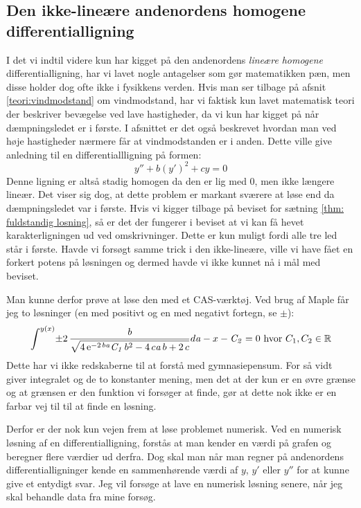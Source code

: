 \subsection{Den ikke-lineære andenordens homogene differentialligning}
\label{teori: Den ikke-linear andenordens ligning}
I det vi indtil videre kun har kigget på den andenordens \textit{lineære} \textit{homogene} differentialligning, har vi lavet nogle antagelser som gør matematikken pæn, men disse holder dog ofte ikke i fysikkens verden.
Hvis man ser tilbage på afsnit \ref{teori:vindmodstand} om vindmodstand, har vi faktisk kun lavet matematisk teori der beskriver bevægelse ved lave hastigheder, da vi kun har kigget på når dæmpningsledet er i første. 
I afsnittet er det også beskrevet hvordan man ved høje hastigheder nærmere får at vindmodstanden er i anden.
Dette ville give anledning til en differentiallligning på formen:
$$y'' + b(y')^2 + cy = 0$$
Denne ligning er altså stadig homogen da den er lig med $0$, men ikke længere lineær. 
Det viser sig dog, at dette problem er markant sværere at løse end da dæmpningsledet var i første. 
Hvis vi kigger tilbage på beviset for sætning \ref{thm: fuldstandig losning}, så er det der fungerer i beviset at vi kan få hevet karakterligningen ud ved omskrivninger. 
Dette er kun muligt fordi alle tre led står i første. 
Havde vi forsøgt samme trick i den ikke-lineære, ville vi have fået en forkert potens på løsningen og dermed havde vi ikke kunnet nå i mål med beviset. 

Man kunne derfor prøve at løse den med et CAS-værktøj. 
Ved brug af Maple får jeg to løsninger (en med positivt og en med negativt fortegn, se $\pm$):
$$\int ^{y \left( x \right) }\!\pm 2\,{\frac {b}{\sqrt {4\,{{\rm e}^{-2\,b{
\it a}}}{\it C_1}\,{b}^{2}-4\,c{\it a}\,b+2\,c}}}{d{\it a}}-x-{
\it C_2}=0 \text{ hvor } C_1,C_2 \in \mathbb{R}
$$
Dette har vi ikke redskaberne til at forstå med gymnasiepensum. 
For så vidt giver integralet og de to konstanter mening, men det at der kun er en øvre grænse og at grænsen er den funktion vi forsøger at finde, gør at dette nok ikke er en farbar vej til til at finde en løsning. 

Derfor er der nok kun vejen frem at løse problemet numerisk. 
Ved en numerisk løsning af en differentialligning, forstås at man kender en værdi på grafen og beregner flere værdier ud derfra.
Dog skal man når man regner på andenordens differentialligninger kende en sammenhørende værdi af $y$, $y'$ eller $y''$ for at kunne give et entydigt svar.
Jeg vil forsøge at lave en numerisk løsning senere, når jeg skal behandle data fra mine forsøg. 
